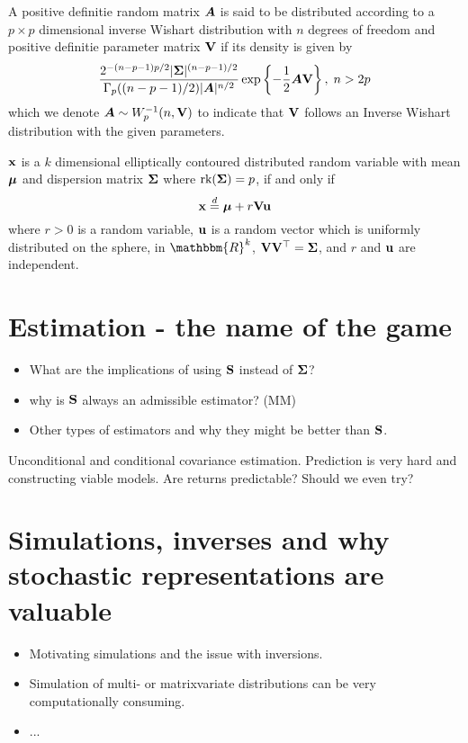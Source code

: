 \documentclass[]{book}
\begin{document}
\begin{definition}
	A positive definitie random matrix $\mbox{\boldmath$A$}$ is said to be distributed according to a $p\times p$ dimensional inverse Wishart distribution with $n$ degrees of freedom and positive definitie parameter matrix $\mathbf{V}$ if its density is given by
	\begin{equation}\label{eqn:inverse_wishart}
	\frac{2^{-(n-p-1)p/2} |\mathbf{\Sigma}|^{(n-p-1)/2} }{\Gamma_p ((n-p-1)/2) |\mbox{\boldmath$A$}|^{n/2}} \exp\left\{ -\frac{1}{2} \mbox{\boldmath$A$} \mathbf{V} \right\}, \; n> 2p
	\end{equation}
	which we denote $\mbox{\boldmath$A$} \sim W^{-1}_p(n, \mathbf{V})$ to indicate that $\mathbf{V}$ follows an Inverse Wishart distribution with the given parameters.
\end{definition}


\begin{lemma}\label{lem:stoc_rep}
	$\mathbf{x}$ is a $k$ dimensional elliptically contoured distributed random variable with mean $\mbox{\boldmath$\mu$}$ and dispersion matrix $\mathbf{\Sigma}$ where $\text{rk} (\mathbf{\Sigma}) = p$, if and only if 
	$$
	\mathbf{x} \stackrel{d}{=} \mbox{\boldmath$\mu$} + r \mathbf{V} \mathbf{u}
	$$
	where $r >0$ is a random variable, $\mathbf{u}$ is a random vector which is uniformly distributed on the sphere, in $\mathbbm{R}^k$, $\mathbf{V}\mathbf{V}^\top=\mathbf{\Sigma}$, and $r$ and $\mathbf{u}$ are independent.
\end{lemma}

\section{Estimation - the name of the game}

\begin{itemize}
	\item What are the implications of using $\mathbf{S}$ instead of $\mathbf{\Sigma}$?
	\item why is $\mathbf{S}$  always an admissible estimator? (MM)
	\item Other types of estimators and why they might be better than $\mathbf{S}$.
\end{itemize}

\begin{remark}
	Unconditional and conditional covariance estimation. Prediction is very hard and constructing viable models. Are returns predictable? Should we even try?
\end{remark}

\section{Simulations, inverses and why stochastic representations are valuable}
\begin{itemize}
	\item Motivating simulations and the issue with inversions.
	\item Simulation of multi- or matrixvariate distributions can be very computationally consuming.
	\item ...
\end{itemize}
\end{document}

